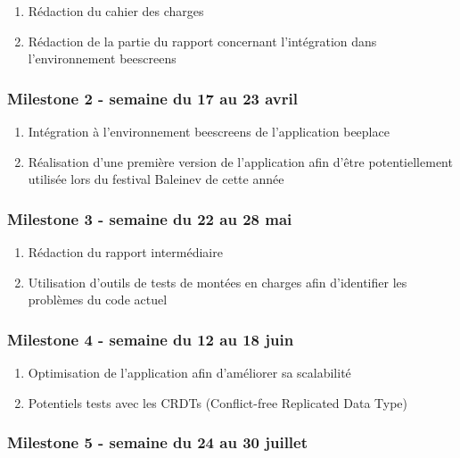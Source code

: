 \begin{enumerate}
  \item Rédaction du cahier des charges
  \item Rédaction de la partie du rapport concernant l'intégration dans l'environnement \gls{beescreens}
\end{enumerate}

\subsubsection{Milestone 2 - semaine du 17 au 23 avril}

\begin{enumerate}
  \item Intégration à l'environnement \gls{beescreens} de l'application \gls{beeplace}
  \item Réalisation d'une première version de l'application afin d'être potentiellement utilisée lors du festival Baleinev de cette année
\end{enumerate}

\subsubsection{Milestone 3 - semaine du 22 au 28 mai}
\label{milestone3}

\begin{enumerate}
  \item Rédaction du rapport intermédiaire
  \item Utilisation d'outils de tests de montées en charges afin d'identifier les problèmes du code actuel
\end{enumerate}

\subsubsection{Milestone 4 - semaine du 12 au 18 juin}

\begin{enumerate}
  \item Optimisation de l'application afin d'améliorer sa scalabilité
  \item Potentiels tests avec les CRDTs (Conflict-free Replicated Data Type)
\end{enumerate}

\subsubsection{Milestone 5 - semaine du 24 au 30 juillet}


